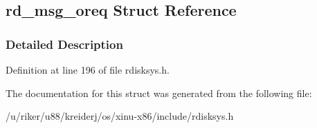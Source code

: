 \hypertarget{structrd__msg__oreq}{}\subsection{rd\+\_\+msg\+\_\+oreq Struct Reference}
\label{structrd__msg__oreq}


\subsubsection{Detailed Description}


Definition at line 196 of file rdisksys.\+h.



The documentation for this struct was generated from the following file\+:\begin{DoxyCompactItemize}
\item 
/u/riker/u88/kreiderj/os/xinu-\/x86/include/rdisksys.\+h\end{DoxyCompactItemize}
